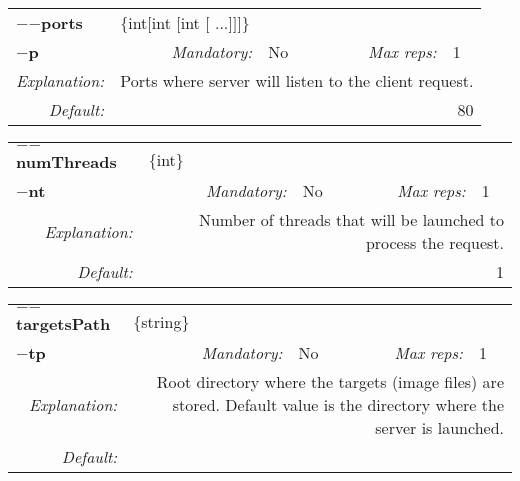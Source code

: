\begin{center}\begin{tabular}{|rr|rl|rl|}
\hline
\multicolumn{2}{|l|}{\textbf{$-$$-$ports}} & \multicolumn{4}{|l|}{$\{$int$[$int $[$int $[$ ...$]$$]$$]$$\}$} \\
\cline{3-6}
\multicolumn{2}{|l|}{\textbf{$-$p}} & \emph{Mandatory:} & No & \emph{Max reps:} & 1 \\
\hline
\emph{Explanation:} & \multicolumn{5}{|p{12cm}|}{Ports where server will listen to the client request.} \\
\hline
\emph{Default:} & \multicolumn{5}{|p{12cm}|}{80} \\
\hline
\end{tabular}\end{center}

\begin{center}\begin{tabular}{|rr|rl|rl|}
\hline
\multicolumn{2}{|l|}{\textbf{$-$$-$numThreads}} & \multicolumn{4}{|l|}{$\{$int$\}$} \\
\cline{3-6}
\multicolumn{2}{|l|}{\textbf{$-$nt}} & \emph{Mandatory:} & No & \emph{Max reps:} & 1 \\
\hline
\emph{Explanation:} & \multicolumn{5}{|p{12cm}|}{Number of threads that will be launched to process the request.} \\
\hline
\emph{Default:} & \multicolumn{5}{|p{12cm}|}{1} \\
\hline
\end{tabular}\end{center}

\begin{center}\begin{tabular}{|rr|rl|rl|}
\hline
\multicolumn{2}{|l|}{\textbf{$-$$-$targetsPath}} & \multicolumn{4}{|l|}{$\{$string$\}$} \\
\cline{3-6}
\multicolumn{2}{|l|}{\textbf{$-$tp}} & \emph{Mandatory:} & No & \emph{Max reps:} & 1 \\
\hline
\emph{Explanation:} & \multicolumn{5}{|p{12cm}|}{Root directory where the targets (image files) are stored. Default value is the directory where the server is launched.} \\
\hline
\emph{Default:} & \multicolumn{5}{|p{12cm}|}{} \\
\hline
\end{tabular}\end{center}

